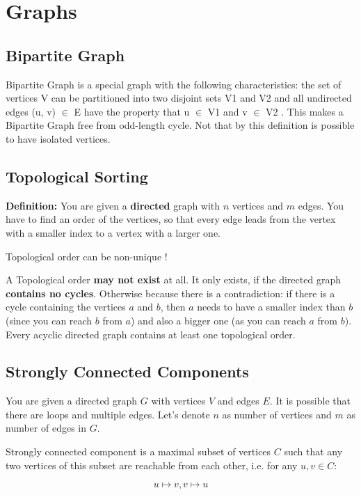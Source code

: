 \section{Graphs}


\subsection{Bipartite Graph}

Bipartite Graph is a special graph with the following characteristics: the set of vertices V can be partitioned into two disjoint sets V1 and V2 and all undirected edges (u, v) $\in$ E have the property that u $\in$ V1 and v $\in$ V2 . This makes a Bipartite Graph free from odd-length cycle.
Not that by this definition is possible to have isolated vertices.

\subsection{Topological Sorting}

\textbf{Definition:} You are given a \textbf{directed} graph with $n$ vertices and $m$ edges. You have to find an order of the vertices, so that every edge leads from the vertex with a smaller index to a vertex with a larger one.

Topological order can be non-unique !

A Topological order \textbf{may not exist} at all. It only exists, if the directed graph \textbf{contains no cycles}. Otherwise because there is a contradiction: if there is a cycle containing the vertices $a$ and $b$, then $a$ needs to have a smaller index than $b$ (since you can reach $b$ from $a$) and also a bigger one (as you can reach $a$ from $b$). Every acyclic directed graph contains at least one topological order.

\subsection{Strongly Connected Components}

You are given a directed graph $G$ with vertices $V$ and edges $E$. It is possible that there are loops and multiple edges. Let's denote $n$ as number of vertices and $m$ as number of edges in $G$.

Strongly connected component is a maximal subset of vertices
$C$ such that any two vertices of this subset are reachable from each other, i.e. for any $u, v \in C$:

$$u \mapsto v, v \mapsto u$$

